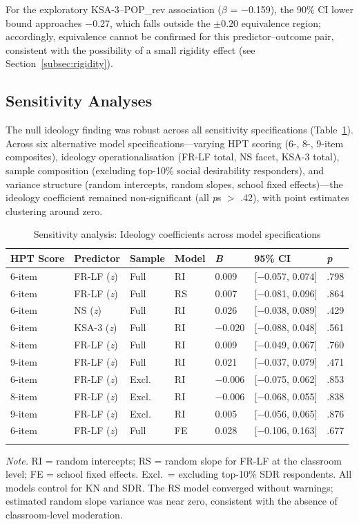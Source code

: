 \documentclass[referee,pdflatex,sn-apa]{sn-jnl}
\begin{document}
For the exploratory KSA-3--POP\_rev association ($\beta$ = $-$0.159), the 90\% CI lower bound approaches $-$0.27, which falls outside the $\pm 0.20$ equivalence region; accordingly, equivalence cannot be confirmed for this predictor--outcome pair, consistent with the possibility of a small rigidity effect (see Section~\ref{subsec:rigidity}).

\subsection{Sensitivity Analyses}\label{subsec:sensitivity}

The null ideology finding was robust across all sensitivity specifications (Table~\ref{tab:sensitivity}). Across six alternative model specifications---varying HPT scoring (6-, 8-, 9-item composites), ideology operationalisation (FR-LF total, NS facet, KSA-3 total), sample composition (excluding top-10\% social desirability responders), and variance structure (random intercepts, random slopes, school fixed effects)---the ideology coefficient remained non-significant (all \textit{p}s $>$ .42), with point estimates clustering around zero.

\begin{table}[!t]
\caption{Sensitivity analysis: Ideology coefficients across model specifications}\label{tab:sensitivity}
\small
\begin{tabular}{lllllll}
\toprule
HPT Score & Predictor & Sample & Model & \textit{B} & 95\% CI & \textit{p} \\
\midrule
6-item & FR-LF (\textit{z}) & Full & RI & 0.009 & [$-$0.057, 0.074] & .798 \\
6-item & FR-LF (\textit{z}) & Full & RS & 0.007 & [$-$0.081, 0.096] & .864 \\
6-item & NS (\textit{z}) & Full & RI & 0.026 & [$-$0.038, 0.089] & .429 \\
6-item & KSA-3 (\textit{z}) & Full & RI & $-$0.020 & [$-$0.088, 0.048] & .561 \\
8-item & FR-LF (\textit{z}) & Full & RI & 0.009 & [$-$0.049, 0.067] & .760 \\
9-item & FR-LF (\textit{z}) & Full & RI & 0.021 & [$-$0.037, 0.079] & .471 \\
6-item & FR-LF (\textit{z}) & Excl. & RI & $-$0.006 & [$-$0.075, 0.062] & .853 \\
8-item & FR-LF (\textit{z}) & Excl. & RI & $-$0.006 & [$-$0.068, 0.055] & .838 \\
9-item & FR-LF (\textit{z}) & Excl. & RI & 0.005 & [$-$0.056, 0.065] & .876 \\
6-item & FR-LF (\textit{z}) & Full & FE & 0.028 & [$-$0.106, 0.163] & .677 \\
\botrule
\end{tabular}

\medskip\noindent\small\textit{Note.} RI = random intercepts; RS = random slope for FR-LF at the classroom level; FE = school fixed effects. Excl.\ = excluding top-10\% SDR respondents. All models control for KN and SDR. The RS model converged without warnings; estimated random slope variance was near zero, consistent with the absence of classroom-level moderation.
\end{table}
\end{document}
